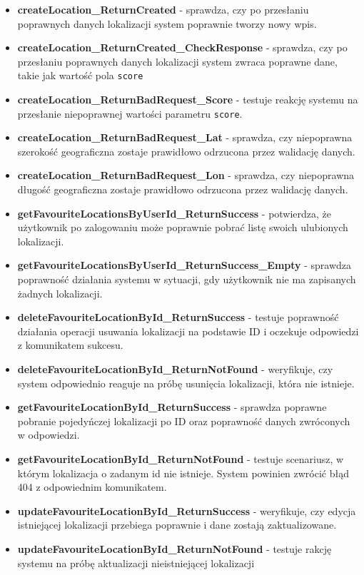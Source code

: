 \documentclass{article}
\begin{document}
\begin{itemize}
    \item \textbf{createLocation\_ReturnCreated} - sprawdza, czy po przesłaniu poprawnych danych lokalizacji system poprawnie tworzy nowy wpis.
    \item \textbf{createLocation\_ReturnCreated\_CheckResponse} - sprawdza, czy po przesłaniu poprawnych danych lokalizacji system zwraca poprawne dane, takie jak wartość pola \texttt{score}
    \item \textbf{createLocation\_ReturnBadRequest\_Score} - testuje reakcję systemu na przesłanie niepoprawnej wartości parametru \texttt{score}.
    \item \textbf{createLocation\_ReturnBadRequest\_Lat} - sprawdza, czy niepoprawna szerokość geograficzna zostaje prawidłowo odrzucona przez walidację danych.
     \item \textbf{createLocation\_ReturnBadRequest\_Lon} - sprawdza, czy niepoprawna długość geograficzna zostaje prawidłowo odrzucona przez walidację danych.
     \item \textbf{getFavouriteLocationsByUserId\_ReturnSuccess} - potwierdza, że użytkownik po zalogowaniu może poprawnie pobrać listę swoich ulubionych lokalizacji.
     \item \textbf{getFavouriteLocationsByUserId\_ReturnSuccess\_Empty} - sprawdza poprawność działania systemu w sytuacji, gdy użytkownik nie ma zapisanych żadnych lokalizacji.
     \item \textbf{deleteFavouriteLocationById\_ReturnSuccess} - testuje poprawność działania operacji usuwania lokalizacji na podstawie ID i oczekuje odpowiedzi z komunikatem sukcesu.
     \item \textbf{deleteFavouriteLocationById\_ReturnNotFound} - weryfikuje, czy system odpowiednio reaguje na próbę usunięcia lokalizacji, która nie istnieje.
     \item \textbf{getFavouriteLocationById\_ReturnSuccess} - sprawdza poprawne pobranie pojedyńczej lokalizacji po ID oraz poprawność danych zwróconych w odpowiedzi.
     \item \textbf{getFavouriteLocationById\_ReturnNotFound} - testuje scenariusz, w którym lokalizacja o zadanym id nie istnieje. System powinien zwrócić błąd 404 z odpowiednim komunikatem.
     \item \textbf{updateFavouriteLocationById\_ReturnSuccess} - weryfikuje, czy edycja istniejącej lokalizacji przebiega poprawnie i dane zostają zaktualizowane.
      \item \textbf{updateFavouriteLocationById\_ReturnNotFound} - testuje rakcję systemu na próbę aktualizacji nieistniejącej lokalizacji

\end{itemize}
\end{document}
